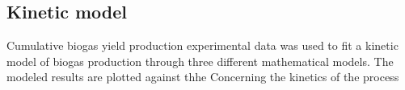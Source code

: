 \subsection{Kinetic model}
Cumulative biogas yield production experimental data was used to fit a kinetic model of biogas production through three different mathematical models. The modeled results are plotted against thhe
Concerning the kinetics of the process